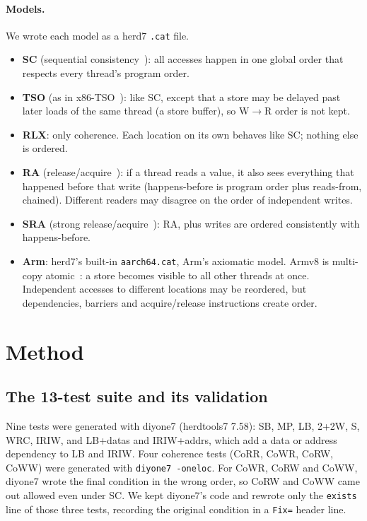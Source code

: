 \documentclass[11pt]{article}
\newcommand{\pair}[2]{#1$\to$#2}
\begin{document}
\paragraph{Models.} We wrote each model as a herd7 \texttt{.cat} file.
\begin{itemize}
  \item \textbf{SC} (sequential consistency~\cite{lamport1979}): all accesses happen in one global
        order that respects every thread's program order.
  \item \textbf{TSO} (as in x86-TSO~\cite{x86tso}): like SC, except that a store may be delayed past
        later loads of the same thread (a store buffer), so \pair{W}{R} order is not kept.
  \item \textbf{RLX}: only coherence. Each location on its own behaves like SC; nothing else is ordered.
  \item \textbf{RA} (release/acquire~\cite{lahav2016}): if a thread reads a value, it also sees everything
        that happened before that write (happens-before is program order plus reads-from, chained).
        Different readers may disagree on the order of independent writes.
  \item \textbf{SRA} (strong release/acquire~\cite{lahav2016}): RA, plus writes are ordered consistently
        with happens-before.
  \item \textbf{Arm}: herd7's built-in \texttt{aarch64.cat}, Arm's axiomatic model. Armv8 is multi-copy
        atomic~\cite{pulte2018}: a store becomes visible to all other threads at once. Independent
        accesses to different locations may be reordered, but dependencies, barriers and
        acquire/release instructions create order.
\end{itemize}

\section{Method}

\subsection{The 13-test suite and its validation}
Nine tests were generated with diyone7 (herdtools7 7.58): SB, MP, LB, 2+2W, S, WRC, IRIW, and
LB+datas and IRIW+addrs, which add a data or address dependency to LB and IRIW. Four coherence tests
(CoRR, CoWR, CoRW, CoWW) were generated with \texttt{diyone7 -oneloc}. For CoWR, CoRW and CoWW,
diyone7 wrote the final condition in the wrong order, so CoRW and CoWW came out allowed even under SC.
We kept diyone7's code and rewrote only the \texttt{exists} line of those three tests, recording the
original condition in a \texttt{Fix=} header line.
\end{document}

